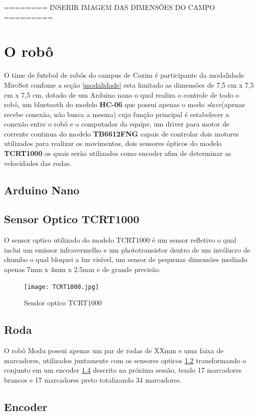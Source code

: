 \documentclass[a4paper,12pt,portuguese]{ufms-cpcx}
\begin{document}
======== INSERIR IMAGEM DAS DIMENSÕES DO CAMPO =========

\chapter{O robô}
O time de futebol de robôs do campus de Coxim é participante da modalidade MiroSot confome a seção \ref{modalidade} esta limitado as dimensões de 7,5 cm x 7,5 cm x 7,5 cm, dotado de um Arduino nano o qual realiza o controle de todo o robô, um bluetooth do modelo \textbf{HC-06} que possui apenas o modo \textit{slave}(apenas recebe conexão, não busca a mesma) cujo função principal é estabelecer a conexão entre o robô e o computador da equipe, um driver para motor de corrente continua do modelo \textbf{TB6612FNG} capais de controlar dois motores utilizados para realizar os movimentos, dois sensores ópticos do modelo \textbf{TCRT1000} os quais serão utilizados como encoder afim de determinar as velocidades das rodas.

\section{Arduino Nano}\label{arduinonano}

\section{Sensor Optico TCRT1000}\label{tcrt1000}
O sensor optico utilizado do modelo TCRT1000 é um sensor refletivo o qual inclui um emissor infravermelho e um phototransistor dentro de um invólucro de chumbo o qual bloquei a luz visível, um sensor de pequenas dimensões medindo apenas 7mm x 4mm x 2.5mm e de grande precisão.
\begin{figure}[H]
	\centering
	\texttt{[image: TCRT1000.jpg]}
	\caption{Sendor optico TCRT1000}
\end{figure}

\section{Roda}\label{roda}
O robô Modu possui apenas um par de rodas de XXmm e uma faixa de marcadores, utilizados juntamente com os sensores opticos \ref{tcrt1000} transformando o conjunto em um encoder \ref{encoder} descrito na próxima sessão, tendo 17 marcadores brancos e 17 marcadores preto totalizando 34 marcadores.

\section{Encoder}\label{encoder}
\end{document}

